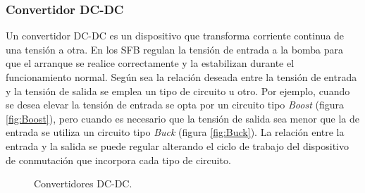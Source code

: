 \subsubsection{Convertidor DC-DC}

Un convertidor DC-DC es un dispositivo que transforma corriente continua
de una tensión a otra. En los SFB regulan la tensión de entrada a
la bomba para que el arranque se realice correctamente y la estabilizan
durante el funcionamiento normal. Según sea la relación deseada entre
la tensión de entrada y la tensión de salida se emplea un tipo de
circuito u otro. Por ejemplo, cuando se desea elevar la tensión de
entrada se opta por un circuito tipo \emph{Boost} (figura \ref{fig:Boost}),
pero cuando es necesario que la tensión de salida sea menor que la
de entrada se utiliza un circuito tipo \emph{Buck} (figura \ref{fig:Buck}).
La relación entre la entrada y la salida se puede regular alterando
el ciclo de trabajo del dispositivo de conmutación que incorpora cada
tipo de circuito. 

%
\begin{figure}
\hfill{}\hfill{}\hfill{}

\caption{Convertidores DC-DC.}



\end{figure}




